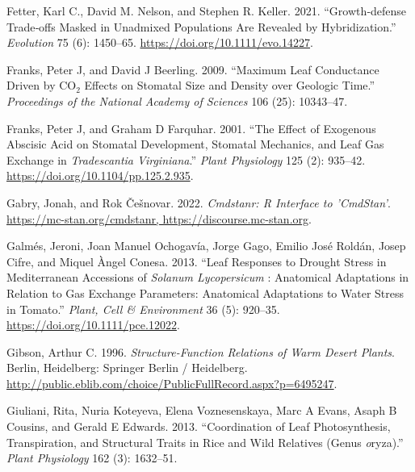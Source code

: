 \documentclass[
  12pt,
]{article}
\newlength{\cslhangindent}
\newlength{\cslentryspacingunit} %
\newenvironment{CSLReferences}[2] %
 {%
  \setlength{\parindent}{0pt}
  \ifodd #1
  \let\oldpar\par
  \def\par{\hangindent=\cslhangindent\oldpar}
  \fi
  \setlength{\parskip}{#2\cslentryspacingunit}
 }%
 {}
\begin{document}
\begin{CSLReferences}{1}{0}
\leavevmode{}%
Fetter, Karl C., David M. Nelson, and Stephen R. Keller. 2021. {``Growth‐defense Trade‐offs Masked in Unadmixed Populations Are Revealed by Hybridization.''} \emph{Evolution} 75 (6): 1450--65. \url{https://doi.org/10.1111/evo.14227}.

\leavevmode{}%
Franks, Peter J, and David J Beerling. 2009. {``Maximum Leaf Conductance Driven by {CO}\(_{\textrm{2}}\) Effects on Stomatal Size and Density over Geologic Time.''} \emph{Proceedings of the National Academy of Sciences} 106 (25): 10343--47.

\leavevmode{}%
Franks, Peter J, and Graham D Farquhar. 2001. {``The {Effect} of {Exogenous} {Abscisic} {Acid} on {Stomatal} {Development}, {Stomatal} {Mechanics}, and {Leaf} {Gas} {Exchange} in \emph{{Tradescantia} Virginiana}.''} \emph{Plant Physiology} 125 (2): 935--42. \url{https://doi.org/10.1104/pp.125.2.935}.

\leavevmode{}%
Gabry, Jonah, and Rok Češnovar. 2022. \emph{Cmdstanr: {R} {Interface} to '{CmdStan}'}. \href{https://mc-stan.org/cmdstanr,\%20https://discourse.mc-stan.org}{https://mc-stan.org/cmdstanr, https://discourse.mc-stan.org}.

\leavevmode{}%
Galmés, Jeroni, Joan Manuel Ochogavía, Jorge Gago, Emilio José Roldán, Josep Cifre, and Miquel Àngel Conesa. 2013. {``Leaf Responses to Drought Stress in {Mediterranean} Accessions of \emph{{Solanum} Lycopersicum} : Anatomical Adaptations in Relation to Gas Exchange Parameters: {Anatomical} Adaptations to Water Stress in Tomato.''} \emph{Plant, Cell \& Environment} 36 (5): 920--35. \url{https://doi.org/10.1111/pce.12022}.

\leavevmode{}%
Gibson, Arthur C. 1996. \emph{Structure-{Function} {Relations} of {Warm} {Desert} {Plants}}. Berlin, Heidelberg: Springer Berlin / Heidelberg. \url{http://public.eblib.com/choice/PublicFullRecord.aspx?p=6495247}.

\leavevmode{}%
Giuliani, Rita, Nuria Koteyeva, Elena Voznesenskaya, Marc A Evans, Asaph B Cousins, and Gerald E Edwards. 2013. {``Coordination of Leaf Photosynthesis, Transpiration, and Structural Traits in Rice and Wild Relatives (Genus \emph{o}ryza).''} \emph{Plant Physiology} 162 (3): 1632--51.


\end{CSLReferences}
\end{document}
